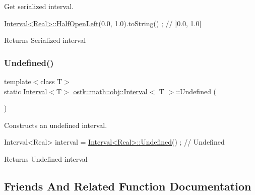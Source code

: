 Get serialized interval. 


\begin{DoxyCode}
\hyperlink{classostk_1_1math_1_1obj_1_1_interval_a47bfd73591e68d8c1c7ff1fd626cbf5b}{Interval<Real>::HalfOpenLeft}(0.0, 1.0).toString() ; \textcolor{comment}{// ]0.0, 1.0]}
\end{DoxyCode}


\begin{DoxyReturn}{Returns}
Serialized interval 
\end{DoxyReturn}
\mbox{\label{classostk_1_1math_1_1obj_1_1_interval_a34149197805573678f6ed5d29679be88}} 
\subsubsection{\texorpdfstring{Undefined()}{Undefined()}}
{\footnotesize\ttfamily template$<$class T$>$ \\
static \hyperlink{classostk_1_1math_1_1obj_1_1_interval}{Interval}$<$T$>$ \hyperlink{classostk_1_1math_1_1obj_1_1_interval}{ostk\+::math\+::obj\+::\+Interval}$<$ T $>$\+::Undefined (\begin{DoxyParamCaption}{ }\end{DoxyParamCaption})\hspace{0.3cm}{\ttfamily [static]}}



Constructs an undefined interval. 


\begin{DoxyCode}
Interval<Real> interval = \hyperlink{classostk_1_1math_1_1obj_1_1_interval_a34149197805573678f6ed5d29679be88}{Interval<Real>::Undefined}() ; \textcolor{comment}{// Undefined}
\end{DoxyCode}


\begin{DoxyReturn}{Returns}
Undefined interval 
\end{DoxyReturn}


\subsection{Friends And Related Function Documentation}
\mbox{\label{classostk_1_1math_1_1obj_1_1_interval_a3aa32afa8cb5d85eeb45540b0bf5657b}} 
